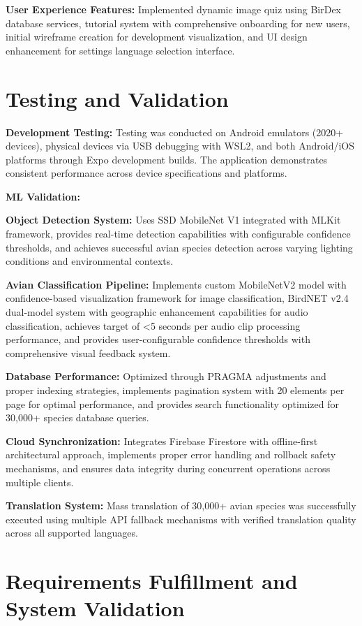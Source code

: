\textbf{User Experience Features:} Implemented dynamic image quiz using BirDex database services, tutorial system with comprehensive onboarding for new users, initial wireframe creation for development visualization, and UI design enhancement for settings language selection interface.

\section{Testing and Validation}

\textbf{Development Testing:} Testing was conducted on Android emulators (2020+ devices), physical devices via USB debugging with WSL2, and both Android/iOS platforms through Expo development builds. The application demonstrates consistent performance across device specifications and platforms.

\textbf{ML Validation:}

\textbf{Object Detection System:} Uses SSD MobileNet V1 integrated with MLKit framework, provides real-time detection capabilities with configurable confidence thresholds, and achieves successful avian species detection across varying lighting conditions and environmental contexts.

\textbf{Avian Classification Pipeline:} Implements custom MobileNetV2 model with confidence-based visualization framework for image classification, BirdNET v2.4 dual-model system with geographic enhancement capabilities for audio classification, achieves target of <5 seconds per audio clip processing performance, and provides user-configurable confidence thresholds with comprehensive visual feedback system.

\textbf{Database Performance:} Optimized through PRAGMA adjustments and proper indexing strategies, implements pagination system with 20 elements per page for optimal performance, and provides search functionality optimized for 30,000+ species database queries.

\textbf{Cloud Synchronization:} Integrates Firebase Firestore with offline-first architectural approach, implements proper error handling and rollback safety mechanisms, and ensures data integrity during concurrent operations across multiple clients.

\textbf{Translation System:} Mass translation of 30,000+ avian species was successfully executed using multiple API fallback mechanisms with verified translation quality across all supported languages.

\section{Requirements Fulfillment and System Validation}

